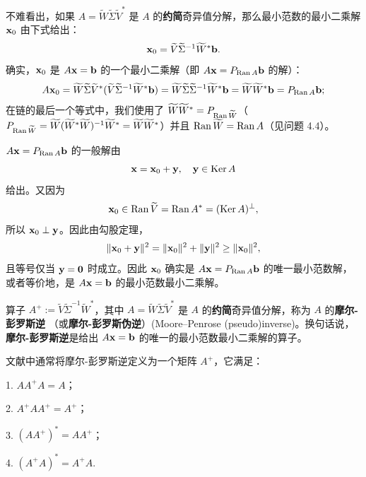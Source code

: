 不难看出，如果 $A = \widetilde{W} \widetilde{\Sigma} \widetilde{V}^*$ 是 $A$ 的\textbf{约简}奇异值分解，那么最小范数的最小二乘解 $\mathbf{x}_0$ 由下式给出：
\begin{equation}\label{eq:06-04-02}
\mathbf{x}_0 = \widetilde{V} \widetilde{\Sigma}^{-1} \widetilde{W}^* \mathbf{b}.
\end{equation}
确实，$\mathbf{x}_0$ 是 $A\mathbf{x} = \mathbf{b}$ 的一个最小二乘解（即 $A\mathbf{x} = P_{\operatorname{Ran} A} \mathbf{b}$ 的解）：
$$A\mathbf{x}_0 = \widetilde{W} \widetilde{\Sigma} \widetilde{V}^* (\widetilde{V} \widetilde{\Sigma}^{-1} \widetilde{W}^* \mathbf{b}) = \widetilde{W} \widetilde{\Sigma} \widetilde{\Sigma}^{-1} \widetilde{W}^* \mathbf{b} = \widetilde{W} \widetilde{W}^* \mathbf{b} = P_{\operatorname{Ran} A} \mathbf{b};$$
在链的最后一个等式中，我们使用了 $\widetilde{W} \widetilde{W}^* = P_{\operatorname{Ran} \widetilde{W}}$（$P_{\operatorname{Ran} \widetilde{W}} = \widetilde{W} (\widetilde{W}^* \widetilde{W})^{-1} \widetilde{W}^* = \widetilde{W} \widetilde{W}^*$）并且 $\operatorname{Ran} \widetilde{W} = \operatorname{Ran} A$（见问题 4.4）。

$A\mathbf{x} = P_{\operatorname{Ran} A} \mathbf{b}$ 的一般解由
$$\mathbf{x} = \mathbf{x}_0 + \mathbf{y},\quad \mathbf{y} \in \operatorname{Ker} A$$
给出。又因为
$$\mathbf{x}_0 \in \operatorname{Ran} \widetilde{V} = \operatorname{Ran} A^* = (\operatorname{Ker} A)^\perp,$$
所以 $\mathbf{x}_0 \perp \mathbf{y}$。因此由勾股定理，
$$\|\mathbf{x}_0+\mathbf{y}\|^2=\|\mathbf{x}_0\|^2+\|\mathbf{y}\|^2\geq\|\mathbf{x}_0\|^2,$$
且等号仅当 $\mathbf{y}=\mathbf{0}$ 时成立。因此 $\mathbf{x}_0$ 确实是 $A\mathbf{x} = P_{\operatorname{Ran} A} \mathbf{b}$ 的唯一最小范数解，或者等价地，是 $A\mathbf{x} = \mathbf{b}$ 的最小范数最小二乘解。

\begin{definition}\label{stmt:06-04-01}
算子 $A^+ := \widetilde{V} \widetilde{\Sigma}^{-1} \widetilde{W}^*$，其中 $A = \widetilde{W} \widetilde{\Sigma} \widetilde{V}^*$ 是 $A$ 的\textbf{约简}奇异值分解，称为 $A$ 的\textbf{摩尔-彭罗斯逆} （或\textbf{摩尔-彭罗斯伪逆}）(Moore–Penrose (pseudo)inverse)。换句话说，\textbf{摩尔-彭罗斯逆}是给出 $A\mathbf{x} = \mathbf{b}$ 的唯一的最小范数最小二乘解的算子。
\end{definition}

\begin{remark}\label{stmt:06-04-02}
文献中通常将摩尔-彭罗斯逆定义为一个矩阵 $A^+$，它满足：
\end{remark}

1. $AA^+A = A$；

2. $A^+AA^+ = A^+$；

3. $(AA^+)^* = AA^+$；

4. $(A^+A)^* = A^+A$.~

